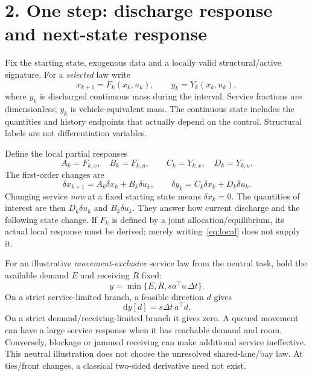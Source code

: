 \documentclass[11pt]{article}
\newcommand{\dd}{\mathrm d}
\begin{document}
\section*{2. One step: discharge response and next-state response}

Fix the starting state, exogenous data and a locally valid structural/active signature. For a \emph{selected} law write
\begin{equation}
 x_{k+1}=F_k(x_k,u_k),\qquad y_k=Y_k(x_k,u_k),
 \label{eq:transition}
\end{equation}
where $y_k$ is discharged continuous mass during the interval. Service fractions are dimensionless; $y_k$ is vehicle-equivalent mass. The continuous state includes the quantities and history endpoints that actually depend on the control. Structural labels are not differentiation variables.

Define the local partial responses
\begin{equation}
 A_k=F_{k,x},\quad B_k=F_{k,u},\qquad
 C_k=Y_{k,x},\quad D_k=Y_{k,u}.
\end{equation}
The first-order changes are
\begin{equation}
 \delta x_{k+1}=A_k\delta x_k+B_k\delta u_k,
 \qquad
 \delta y_k=C_k\delta x_k+D_k\delta u_k.
 \label{eq:local}
\end{equation}
Changing service \emph{now} at a fixed starting state means $\delta x_k=0$. The quantities of interest are then $D_k\delta u_k$ and $B_k\delta u_k$. They answer how current discharge and the following state change. If $F_k$ is defined by a joint allocation/equilibrium, its actual local response must be derived; merely writing~\eqref{eq:local} does not supply it.

For an illustrative \emph{movement-exclusive} service law from the neutral task, hold the available demand $E$ and receiving $R$ fixed:
\begin{equation}
 y=\min\{E,R,s a^\top u\,\Delta t\}.
\end{equation}
On a strict service-limited branch, a feasible direction $d$ gives
\begin{equation}
 \dd y[d]=s\Delta t\,a^\top d.
\end{equation}
On a strict demand/receiving-limited branch it gives zero. A queued movement can have a large service response when it has reachable demand and room. Conversely, blockage or jammed receiving can make additional service ineffective. This neutral illustration does not choose the unresolved shared-lane/bay law. At ties/front changes, a classical two-sided derivative need not exist.
\end{document}
